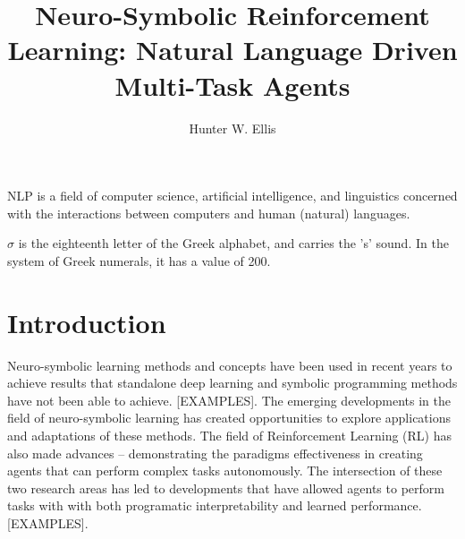 \documentclass[doublespace,draft,nopageskip]{VTthesis} %
\title{Neuro-Symbolic Reinforcement Learning: Natural Language Driven Multi-Task Agents}
\author{Hunter W. Ellis}
\begin{document}
  \frontmatter
  \maketitle
  \tableofcontents

	\listoffigures
	\listoftables
    \printnomenclature %

NLP is a field of computer science, artificial intelligence, and linguistics concerned with the interactions between computers and human (natural) languages.
 
 
$\sigma$ is the eighteenth letter of the Greek alphabet, and carries the 's' sound. In the system of Greek numerals, it has a value of 200. 
 

	\mainmatter

	\chapter{Introduction} \label{ch:introduction}
    Neuro-symbolic learning methods and concepts have been used in recent years to achieve results that standalone deep learning and symbolic programming methods have not been able to achieve. [EXAMPLES]. The emerging developments in the field of neuro-symbolic learning has created opportunities to explore applications and adaptations of these methods. The field of Reinforcement Learning (RL) has also made advances -- demonstrating the paradigms effectiveness in creating agents that can perform complex tasks autonomously. The intersection of these two research areas has led to developments that have allowed agents to perform tasks with with both programatic interpretability and learned performance. [EXAMPLES].
\end{document}

